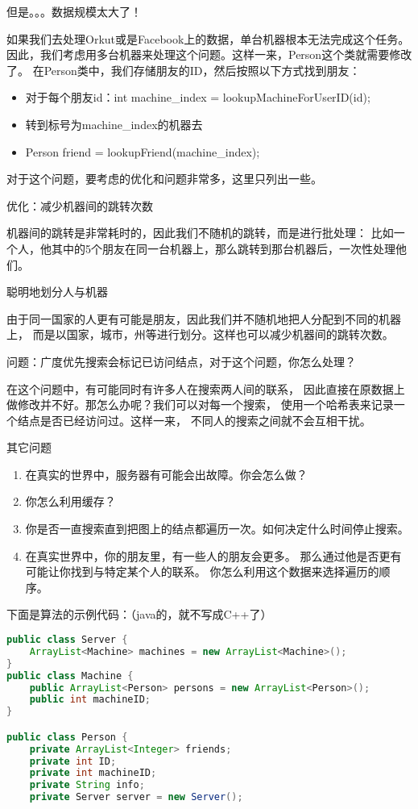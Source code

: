 \begin{description}
但是。。。数据规模太大了！

如果我们去处理Orkut或是Facebook上的数据，单台机器根本无法完成这个任务。 因此，我们考虑用多台机器来处理这个问题。这样一来，Person这个类就需要修改了。 在Person类中，我们存储朋友的ID，然后按照以下方式找到朋友：
\begin{itemize}
\item 对于每个朋友id：int machine\_index = lookupMachineForUserID(id);
\item 转到标号为machine\_index的机器去
\item Person friend = lookupFriend(machine\_index);
\end{itemize}
对于这个问题，要考虑的优化和问题非常多，这里只列出一些。

优化：减少机器间的跳转次数

机器间的跳转是非常耗时的，因此我们不随机的跳转，而是进行批处理： 比如一个人，他其中的5个朋友在同一台机器上，那么跳转到那台机器后，一次性处理他们。

聪明地划分人与机器

由于同一国家的人更有可能是朋友，因此我们并不随机地把人分配到不同的机器上， 而是以国家，城市，州等进行划分。这样也可以减少机器间的跳转次数。

问题：广度优先搜索会标记已访问结点，对于这个问题，你怎么处理？

在这个问题中，有可能同时有许多人在搜索两人间的联系， 因此直接在原数据上做修改并不好。那怎么办呢？我们可以对每一个搜索， 使用一个哈希表来记录一个结点是否已经访问过。这样一来， 不同人的搜索之间就不会互相干扰。

其它问题
\begin{enumerate}
\item 在真实的世界中，服务器有可能会出故障。你会怎么做？
\item 你怎么利用缓存？
\item 你是否一直搜索直到把图上的结点都遍历一次。如何决定什么时间停止搜索。
\item 在真实世界中，你的朋友里，有一些人的朋友会更多。 那么通过他是否更有可能让你找到与特定某个人的联系。 你怎么利用这个数据来选择遍历的顺序。
\end{enumerate}
下面是算法的示例代码：（java的，就不写成C++了）
\begin{lstlisting}[language=Java]
public class Server { 
    ArrayList<Machine> machines = new ArrayList<Machine>();
}
public class Machine {
    public ArrayList<Person> persons = new ArrayList<Person>();
    public int machineID;
}

public class Person {    
    private ArrayList<Integer> friends;
    private int ID;
    private int machineID;
    private String info;
    private Server server = new Server();
    

\end{lstlisting}
\end{description}
